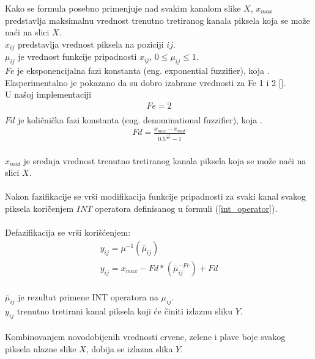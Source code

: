 \documentclass[12pt,a4paper]{article}
\theoremstyle{definition}
\theoremstyle{remark}
\theoremstyle{plain}
\begin{document}
Kako se formula posebno primenjuje nad svakim kanalom slike $X$, $x_{max}$ predstavlja maksimalnu vrednost trenutno tretiranog kanala piksela koja se mo\v ze na\' ci na slici $X$.\\
$x_{ij}$ predstavlja vrednost piksela na poziciji $ij$. \\ 
$\mu_{ij}$ je vrednost funkcije pripadnosti $x_{ij}$, $0\leq \mu_{ij} \leq 1$.\\
$Fe$ je eksponencijalna fazi konstanta (eng. exponential fuzzifier), koja . \\
Eksperimentalno je pokazano da su dobro izabrane vrednosti za Fe 1 i 2 []. \\
U na\v soj implementaciji 
\begin{align*}
  Fe = 2\\
\end{align*}
$Fd$ je koli\v cni\v cka fazi konstanta (eng. denominational fuzzifier), koja . \\
\begin{align*}
  Fd = \frac{x_{max} - x_{mid}}{0.5^{\frac{-1}{Fe}} - 1}
\end{align*}
\\
$x_{mid}$ je srednja vrednost trenutno tretiranog kanala piksela koja se mo\v ze na\' ci na slici $X$. \\ \\
Nakon fazifikacije se vr\v si modifikacija funkcije pripadnosti za svaki kanal svakog piksela kori\v \' cenjem $INT$ operatora definisanog u formuli (\ref{int_operator}).\\
\\
Defazifikacija se vr\v si kori\v s\' cenjem:\\
\begin{align*}
  y_{ij} = \mu^{-1}(\bar\mu_{ij})\\
  y_{ij} = x_{max} - Fd * (\bar\mu_{ij}^{-Fe}) + Fd\\
\end{align*}

$\bar\mu_{ij}$ je rezultat primene INT operatora n\mbox a $\mu_{ij}$. \\
$y_{ij}$ trenutno tretirani kanal piksela koji \' ce \v ciniti izlaznu sliku $Y$.\\
\\
Kombinovanjem novodobijenih vrednosti crvene, zelene i plave boje svakog piksela ulazne slike $X$, dobija se izlazna slika $Y$.

\inputminted[tabsize=2,breaklines]{cpp}{codes/latex/fuzzy_color.cpp}
\end{document}
